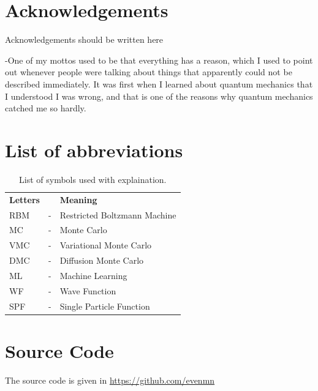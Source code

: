 \thispagestyle{empty}
\clearpage

\thispagestyle{empty}
\clearpage

\section*{Acknowledgements}
    Acknowledgements should be written here
    
    -One of my mottos used to be that everything has a reason, which I used to point out whenever people were talking about things that apparently could not be described immediately. It was first when I learned about quantum mechanics that I understood I was wrong, and that is one of the reasons why quantum mechanics catched me so hardly. 
    
\thispagestyle{empty}
\clearpage

{%
    \tableofcontents
    \thispagestyle{empty}
    \clearpage}%

\thispagestyle{empty}
\clearpage

\section*{List of abbreviations}
\begin{table}[H]
    \centering
    \begin{tabular}{lcl}
        \textbf{Letters} & & \textbf{Meaning} \\
        RBM & - & Restricted Boltzmann Machine \\
        MC & - & Monte Carlo \\
        VMC & - & Variational Monte Carlo \\
        DMC & - & Diffusion Monte Carlo \\
        ML & - & Machine Learning \\
        WF & - & Wave Function \\
        SPF & - & Single Particle Function \\

    \end{tabular}
    \caption{List of symbols used with explaination.}
    \label{tab:symbols}
\end{table}
\thispagestyle{empty}
\clearpage

\section*{Source Code}
    The source code is given in \url{https://github.com/evenmn}

\thispagestyle{empty}
\clearpage
